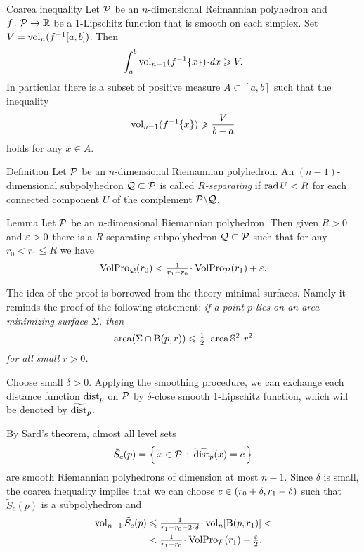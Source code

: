 \begin{thm}{Coarea inequality}
Let $\mathcal{P}$ be an $n$-dimensional Reimannian polyhedron and $f\colon\mathcal{P}\to \mathbb{R}$ be a 1-Lipschitz function that is smooth on each simplex.
Set $V=\operatorname{\rm vol}\nolimits_n (f^{-1}[a,b])$.
Then 
\[\int_a^b\vol_{n-1}(f^{-1}\{x\})\cdot dx\ge V .\]
In particular there is a subset of positive measure $A\subset [a,b]$ such that the inequality 
\[\operatorname{\rm vol}\nolimits_{n-1}(f^{-1}\{x\})\geqslant \frac V{b-a}\]
holds for any $x\in A$.
\end{thm}

\begin{thm}{Definition}
Let $\mathcal{P}$ be an $n$-dimensional Riemannian polyhedron.
An $(n-1)$-dimensional subpolyhedron $\mathcal{Q}\subset\mathcal{P}$ is called \emph{$R$-separating} if $\mathop{\rm rad}\nolimits U<R$ for each connected component $U$ of the complement $\mathcal{P}\backslash \mathcal{Q}$.
\end{thm}



\begin{thm}{Lemma}\label{lem:separating}
Let $\mathcal{P}$ be an $n$-dimensional Riemannian polyhedron.
Then given $R>0$ and $\varepsilon>0$ there is a $R$-separating subpolyhedron $\mathcal{Q}\subset\mathcal{P}$ such that for any $r_0<r_1\le R$ we have
\[\VolPro_{\spc{Q}}(r_0)< \tfrac1{r_1-r_0}\cdot \VolPro_{\spc{P}}(r_1)+\eps.\]

\end{thm}

The idea of the proof is borrowed from the theory minimal surfaces.
Namely it reminds the proof of the following statement: 
\emph{if a point $p$ lies on an area minimizing surface $\Sigma$, then 
\[\area(\Sigma\cap \oBall(p,r))\le \tfrac12\cdot \area\mathbb{S}^2\cdot r^2\]
for all small $r>0$.}

Choose small $\delta>0$.
Applying the smoothing procedure, we can exchange each distance function $\mathrm{dist}_p$ on $\mathcal{P}$ by $\delta$-close smooth 1-Lipschitz function, which will be denoted by $\widetilde {\mathrm{dist}}_p$.

By Sard's theorem, almost all level sets 
\[\tilde S_c(p)=\left\{\,{x\in \mathcal{P}}\,:\,{\widetilde {\mathrm{dist}}_p(x)=c}\,\right\}\]
are smooth Riemannian polyhedrons of dimension at most $n-1$.
Since $\delta$ is small, the coarea inequality implies that we can choose $c\z\in(r_0+\delta, r_1-\delta)$ such that $\tilde S_c(p)$ is a subpolyhedron and 
\begin{align*}
\vol_{n-1}\tilde S_c(p)&\le \tfrac1{r_1-r_0-2\cdot\delta}\cdot\vol_n[\oBall(p,r_1)]<
\\
&<\tfrac1{r_1-r_0}\cdot \VolPro_{\spc{P}}(r_1)+\tfrac\eps2.
\end{align*}

